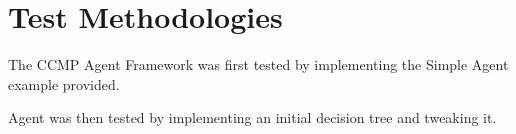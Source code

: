 \section{Test Methodologies}
The CCMP Agent Framework was first tested by implementing the Simple Agent
example provided.

Agent was then tested by implementing an initial decision tree and tweaking it.
